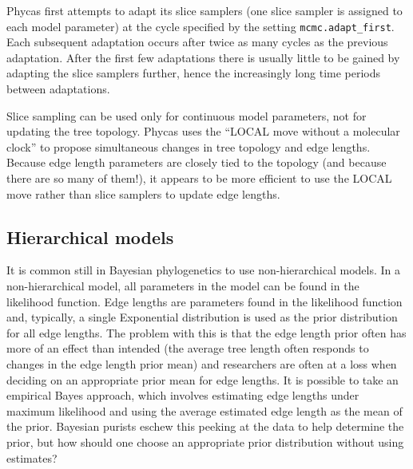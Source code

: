 \documentclass[10pt]{article}
\newcommand{\opt}[1]{{\tt \small #1}\index{#1}}	%
\begin{document}
Phycas first attempts to adapt its slice samplers (one slice sampler is assigned to each model parameter) at the cycle specified by the setting \opt{mcmc.adapt\_first}. Each subsequent adaptation occurs after twice as many cycles as the previous adaptation. After the first few adaptations there is usually little to be gained by adapting the slice samplers further, hence the increasingly long time periods between adaptations. 

Slice sampling can be used only for continuous model parameters, not for updating the tree topology. Phycas uses the \citet{LargetSimon1999} ``LOCAL move without a molecular clock'' to propose simultaneous changes in tree topology and edge lengths. Because edge length parameters are closely tied to the topology (and because there are so many of them!), it appears to be more efficient to use the LOCAL move rather than slice samplers to update edge lengths.

\subsection{Hierarchical models} \label{hierarchicalmodels}
It is common still in Bayesian phylogenetics to use non-hierarchical models. In a non-hierarchical model, all parameters in the model can be found in the likelihood function. Edge lengths are parameters found in the likelihood function and, typically, a single Exponential distribution is used as the prior distribution for all edge lengths. The problem with this is that the edge length prior often has more of an effect than intended (the average tree length often responds to changes in the edge length prior mean) and researchers are often at a loss when deciding on an appropriate prior mean for edge lengths. It is possible to take an empirical Bayes approach, which involves estimating edge lengths under maximum likelihood and using the average estimated edge length as the mean of the prior. Bayesian purists eschew this peeking at the data to help determine the prior, but how should one choose an appropriate prior distribution without using estimates? 
\end{document}
